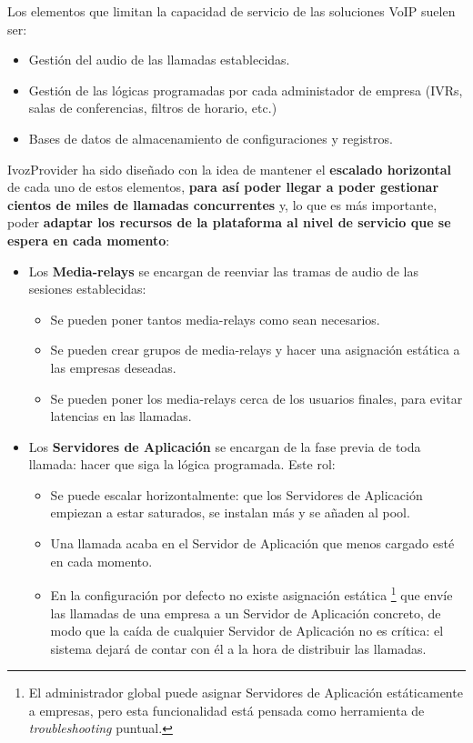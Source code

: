 \documentclass[letterpaper,10pt,spanish]{sphinxmanual}
\begin{document}
Los elementos que limitan la capacidad de servicio de las soluciones VoIP suelen ser:
\begin{itemize}
\item {} 
Gestión del audio de las llamadas establecidas.

\item {} 
Gestión de las lógicas programadas por cada administador de empresa (IVRs, salas de conferencias, filtros de horario, etc.)

\item {} 
Bases de datos de almacenamiento de configuraciones y registros.

\end{itemize}

IvozProvider ha sido diseñado con la idea de mantener el \textbf{escalado horizontal} de cada uno de estos elementos, \textbf{para así poder llegar a poder gestionar cientos de miles de llamadas concurrentes} y, lo que es más importante, poder \textbf{adaptar los recursos de la plataforma al nivel de servicio que se espera en cada momento}:
\begin{itemize}
\item {} 
Los \textbf{Media-relays} se encargan de reenviar las tramas de audio de las sesiones establecidas:
\begin{itemize}
\item {} 
Se pueden poner tantos media-relays como sean necesarios.

\item {} 
Se pueden crear grupos de media-relays y hacer una asignación estática a las empresas deseadas.

\item {} 
Se pueden poner los media-relays cerca de los usuarios finales, para evitar latencias en las llamadas.

\end{itemize}

\item {} 
Los \textbf{Servidores de Aplicación} se encargan de la fase previa de toda llamada: hacer que siga la lógica programada. Este rol:
\begin{itemize}
\item {} 
Se puede escalar horizontalmente: que los Servidores de Aplicación empiezan a estar saturados, se instalan más y se añaden al pool.

\item {} 
Una llamada acaba en el Servidor de Aplicación que menos cargado esté en cada momento.

\item {} 
En la configuración por defecto no existe asignación estática \footnote[*]{\sphinxAtStartFootnote%
El administrador global puede asignar Servidores de Aplicación estáticamente a empresas, pero esta funcionalidad está pensada como herramienta de \emph{troubleshooting} puntual.
} que envíe las llamadas de una empresa a un Servidor de Aplicación concreto, de modo que la caída de cualquier Servidor de Aplicación no es crítica: el sistema dejará de contar con él a la hora de distribuir las llamadas.

\end{itemize}

\end{itemize}
\end{document}
